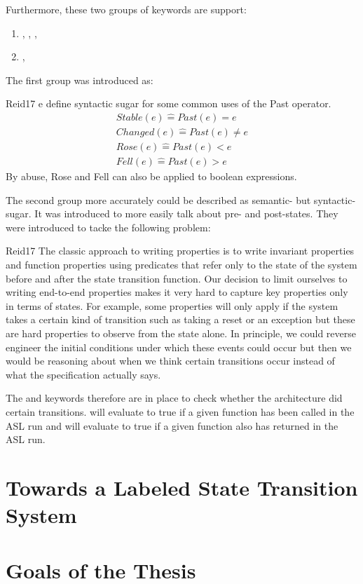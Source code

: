 \documentclass{securem}
\begin{document}
Furthermore, these two groups of keywords are support:
\begin{enumerate}
    \item {}, , , 
    \item {}, 
\end{enumerate}

The first group was introduced as:
\begin{displaycquote}{Reid17}
    e define syntactic sugar for some common uses of the Past operator.
    \begin{align*}
        Stable(e) \widehat{=} Past(e) = e \\
        Changed(e) \widehat{=} Past(e) \neq e \\
        Rose(e) \widehat{=} Past(e) < e \\
        Fell(e) \widehat{=} Past(e) > e
    \end{align*}
    By abuse, Rose and Fell can also be applied to boolean expressions.
\end{displaycquote}

The second group more accurately could be described as semantic- but syntactic-sugar.
It was introduced to more easily talk about pre- and post-states.
They were introduced to tacke the following problem:
\begin{displaycquote}{Reid17}
    The classic approach to writing properties is to write invariant properties and function properties using predicates that refer only to the state of the system before and after the state transition function.
    Our decision to limit ourselves to writing end-to-end properties makes it very hard to capture key properties only in terms of states.
    For example, some properties will only apply if the system takes a certain kind of transition such as taking a reset or an exception but these are hard properties to observe from the state alone.
    In principle, we could reverse engineer the initial conditions under which these events could occur but then we would be reasoning about when we think certain transitions occur instead of what the specification actually says.
\end{displaycquote}

The  and  keywords therefore are in place to check whether the architecture did certain transitions.
 will evaluate to true if a given function has been called in the ASL run and  will evaluate to true if a given function also has returned in the ASL run.

\section{Towards a Labeled State Transition System}

\section{Goals of the Thesis}



\end{document}
